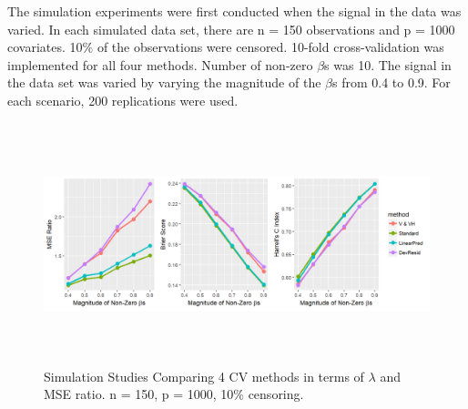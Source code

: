 The simulation experiments were first conducted when the signal in the data was varied. In each simulated data set, there are n = 150 observations and p = 1000 covariates. 10$\%$ of the observations were censored. 10-fold cross-validation was implemented for all four methods. Number of non-zero $\beta$s was 10. The signal in the data set was varied by varying the magnitude of the $\beta$s from 0.4 to 0.9. For each scenario, 200 replications were used. 
   
\begin{figure}[h]
    \centering
		\includegraphics[height= 7cm ]{./figures/figure_2_new.png}
    \caption{Simulation Studies Comparing 4 CV methods in terms of $\lambda$ and MSE ratio. n = 150, p = 1000, 10$\%$ censoring.}
\end{figure}	


